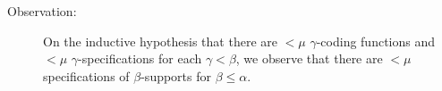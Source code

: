 \documentclass[112pt]{article}
\begin{document}
\begin{description}
\begin{comment}
\item  If $S_{\epsilon}$ is $(\{x\}_\beta,A)$, then $S^*_\epsilon$ is $(0,\beta,\Sigma,A)$ where  $\Sigma$ is the set of all $\delta$ such that $\pi_1(S_\epsilon) \subseteq \pi_1(S_\delta)$ (this captures identical atoms and near litters containing the given atom)

\item  If $S_\epsilon$ is $(N_\beta,A)$ and $N$ is a near-litter, and either $|A|=1$ or $N^\circ$ is not in the range of any $f_{\gamma,\beta}$ for $\gamma<{\tt min}(A_1)$, then $S^*_\epsilon$ is $(1,\beta,A)$.

\item  If $S_\epsilon$ is $(N_\beta,A)$ and $N$ is a near-litter, and $N^\circ=f_{\gamma,\beta}(x,T)$ for $-1<\gamma<{\tt min}(A_1)$, for $x\in \tau_\gamma$ then 
$S^*_\epsilon$ is $(2,\beta,\chi_{x,T},(S_{(\gamma)}+T)^*,A)$.  $S_{(\gamma)}$ denotes the following modification of $S$: if  $$Z=\{(x,B)\in {\tt rng}(S):{\tt max}(B \setminus \{{\tt max}(B)\})=\gamma\}$$ is empty, $S_{(\gamma)}$ is the empty support; otherwise let $\delta$ be the element of $Z$ with minimal index in $S$  and let $(S_{(\gamma)})_\chi$ be  $(x,B\setminus \{{\tt max}(B)\})$ where $(x,B)=\delta$ if $S_\chi \not\in Z$ and otherwise $(x,B\setminus \{{\tt max}(B)\})$ where $(x,B)=S_\chi$. .  The sum of two supports is not unique (the order of the atoms to be added is not determinate), thus specifications are not unique.

\item  If $S_\epsilon$ is $(N_\beta,A)$ and $N$ is a near-litter, and $N^\circ=f_{-1,\beta}(x,\emptyset)$  then $S^*_\epsilon$ is $(3,\beta,\Sigma,A)$, where  $\Sigma$ is the set of all $\delta$ such that $S_\delta$ is $(\{x\}_{{\tt min}(A_1)},{\tt min}(A_1))$.

\end{enumerate}

\end{comment}

\begin{comment}

Peter wants a definition of the type specification independent of the type support.  Use tags.   It's a good idea.

\end{comment}

\item[Observation:]  On the inductive hypothesis that there are $<\mu$ $\gamma$-coding functions and $<\mu$ $\gamma$-specifications for each $\gamma<\beta$, we observe that there are $<\mu$ specifications of $\beta$-supports for $\beta\leq \alpha$.


\end{description}
\end{document}

